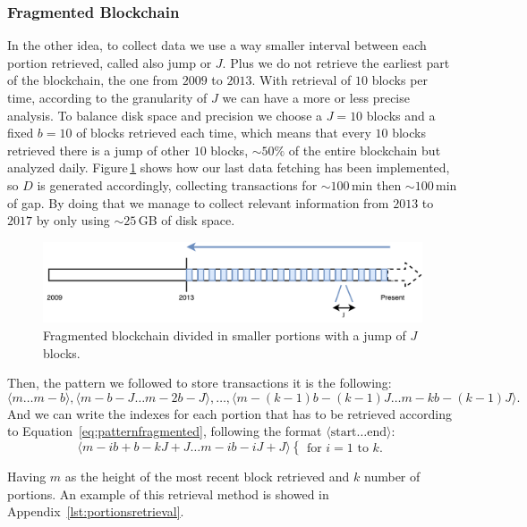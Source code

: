 \documentclass[USenglish]{uit-thesis}
\begin{document}
\subsubsection{Fragmented Blockchain}
In the other idea, to collect data we use a way smaller
interval between each portion
retrieved, called also jump or $J$. Plus
we do not retrieve the earliest part of the
blockchain, the one from $2009$ to $2013$.
With retrieval of $10$ blocks per time,
according to the granularity of $J$ we can
have a more or less precise analysis. To balance
disk space and precision we choose a $J = 10$ blocks
and a fixed $b = 10$ of blocks retrieved each time,
which means that every $10$ blocks retrieved there is
a jump of other $10$ blocks, $\sim$$50\%$ of the entire
blockchain but analyzed daily. Figure\,\ref{fig:portions_new}
shows how our last data fetching has been implemented,
so $D$ is generated accordingly, collecting transactions
for $\sim$$100$\,min then $\sim$$100$\,min of gap.
By doing that we manage to collect relevant
information from $2013$ to $2017$ by only
using $\sim$$25$\,GB of disk space.
\begin{figure}[h]
	\centering
	\includegraphics[width=1\textwidth]{img/portions_new}
	\caption{Fragmented blockchain divided in smaller portions with
	a jump of $J$ blocks.}
	\label{fig:portions_new}
\end{figure}
Then, the pattern we followed to store
transactions it is the following:
\[\langle m \dots m-b\rangle, \langle m-b-J \dots m-2b - J\rangle, \dots , \langle m-(k-1)b -(k-1)J \dots m - kb - (k-1)J\rangle.\]
And we can write the indexes for each portion that has to be retrieved
according to Equation~\ref{eq:patternfragmented},
following the format $\langle \text{start} \dots \text{end}\rangle$:
\begin{equation}
\label{eq:patternfragmented}
\langle m-ib+b-kJ+J\dots m-ib-iJ+J\rangle
\begin{cases}
\textrm{for } i = 1 \textrm{ to } k.
\end{cases}
\end{equation}

Having $m$ as the height of the most recent block retrieved and $k$ number
of portions. An example of this retrieval method is showed in
Appendix~\ref{lst:portionsretrieval}.
\end{document}
